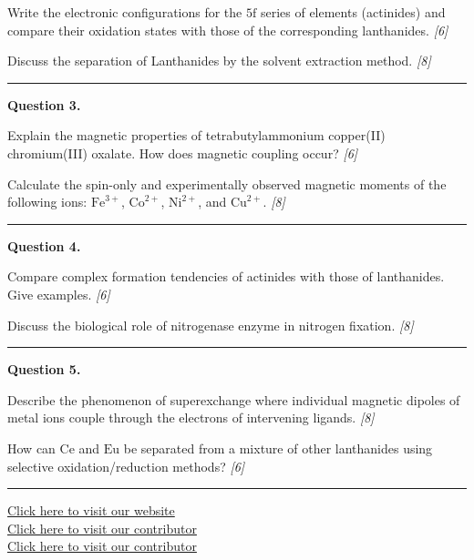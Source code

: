\documentclass[11pt,a4paper]{article}
\newcommand{\pts}[1]{\hfill   \textit{[#1]}}
\begin{document}
\begin{parts}
  \item Write the electronic configurations for the $5 \text{f}$ series of elements (actinides) and compare their oxidation states with those of the corresponding lanthanides. \pts{6}
  \item Discuss the separation of Lanthanides by the solvent extraction method. \pts{8}
\end{parts}

\medskip\rule{\linewidth}{0.2pt}




\noindent   \textbf{Question 3.}

\begin{parts}
  \item Explain the magnetic properties of tetrabutylammonium copper(II) chromium(III) oxalate. How does magnetic coupling occur? \pts{6}
  \item Calculate the spin-only and experimentally observed magnetic moments of the following ions: $ \text{Fe}^{3+}$, $ \text{Co}^{2+}$, $ \text{Ni}^{2+}$, and $ \text{Cu}^{2+}$. \pts{8}
\end{parts}

\medskip\rule{\linewidth}{0.2pt}




\noindent   \textbf{Question 4.}

\begin{parts}
  \item Compare complex formation tendencies of actinides with those of lanthanides. Give examples. \pts{6}
  \item Discuss the biological role of nitrogenase enzyme in nitrogen fixation. \pts{8}
\end{parts}

\medskip\rule{\linewidth}{0.2pt}




\noindent   \textbf{Question 5.}

\begin{parts}
  \item Describe the phenomenon of superexchange where individual magnetic dipoles of metal ions couple through the electrons of intervening ligands. \pts{8}
  \item How can $ \text{Ce}$ and $ \text{Eu}$ be separated from a mixture of other lanthanides using selective oxidation/reduction methods? \pts{6}
\end{parts}

\vfill
\rule{\linewidth}{0.4pt}

\begin{center}\small
  \href{https://bhu-exam.vercel.app/}{Click here to visit our website}\\[4pt]
  \href{https://me-aryan.vercel.app/}{Click here to visit our contributor}\\[4pt]
  \href{https://quashan-me.vercel.app/}{Click here to visit our contributor}
\end{center}
\end{document}
